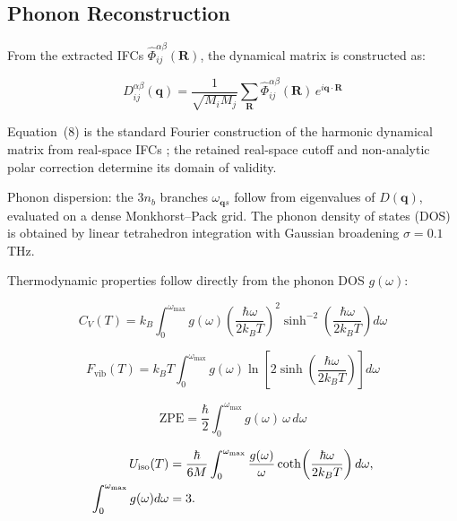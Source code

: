 \documentclass[aps,prb,reprint,amsmath,amssymb,floatfix]{revtex4-2}
\begin{document}
\subsection{Phonon Reconstruction}\label{phonon-reconstruction}

From the extracted IFCs \(\hat{\Phi}_{ij}^{\alpha\beta}(\mathbf{R})\),
the dynamical matrix is constructed as:

\color{revisionblue}
\begin{equation}
D_{ij}^{\alpha\beta}(\mathbf{q}) = \frac{1}{\sqrt{M_i M_j}} \sum_{\mathbf{R}} \hat{\Phi}_{ij}^{\alpha\beta}(\mathbf{R})\, e^{i\mathbf{q}\cdot\mathbf{R}}
\end{equation}
\color{black}

\color{revisionblue}
Equation~(8) is the standard Fourier construction of the harmonic dynamical
matrix from real-space IFCs \cite{ref13}; the retained real-space cutoff and
non-analytic polar correction determine its domain of validity.
\color{black}

Phonon dispersion: the \(3n_b\) branches \(\omega_{\mathbf{q}s}\) follow
from eigenvalues of \(D(\mathbf{q})\), evaluated on a dense
Monkhorst--Pack grid. The phonon density of states (DOS) is obtained by
linear tetrahedron integration with Gaussian broadening \(\sigma = 0.1\)
THz.

Thermodynamic properties follow directly from the phonon DOS
\(g(\omega)\):

\color{revisionblue}
\begin{equation}
C_V(T) = k_B \int_0^{\omega_\text{max}} g(\omega) \left(\frac{\hbar\omega}{2k_BT}\right)^2 \sinh^{-2}\!\left(\frac{\hbar\omega}{2k_BT}\right) d\omega
\end{equation}
\color{black}

\color{revisionblue}
\begin{equation}
F_\text{vib}(T) = k_B T \int_0^{\omega_\text{max}} g(\omega) \ln\!\left[2\sinh\!\left(\frac{\hbar\omega}{2k_BT}\right)\right] d\omega
\end{equation}
\color{black}

\color{revisionblue}
\begin{equation}
\text{ZPE} = \frac{\hbar}{2}\int_0^{\omega_\text{max}} g(\omega)\,\omega\, d\omega
\end{equation}
\color{black}

\color{revisionblue}
\begin{equation}
\begin{aligned}
U_{\rm iso}(T)
 &= \frac{\hbar}{6M}\int_0^{\omega_{\rm max}}
 \frac{g(\omega)}{\omega}
 \coth\!\left(\frac{\hbar\omega}{2k_BT}\right)d\omega,\\
\int_0^{\omega_{\rm max}}g(\omega)d\omega&=3 .
\end{aligned}
\end{equation}
\color{black}
\end{document}

